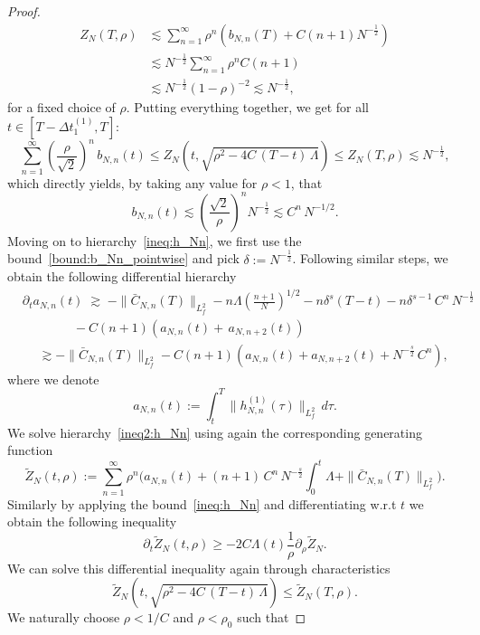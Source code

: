 \documentclass[pdflatex,sn-mathphys-num]{sn-jnl}
\theoremstyle{thmstyleone}%
\theoremstyle{thmstyletwo}%
\theoremstyle{thmstylethree}%
\begin{document}
\begin{proof}
\begin{align*}
Z_{N}(T, \rho) 
&\lesssim \sum_{n=1}^\infty \rho^n \left(  b_{N,n}(T) 
+ C(n+1) N^{-\frac{1}{2}}  \right) \\
&\lesssim N^{-\frac{1}{2}}\sum_{n=1}^\infty \rho^n C(n+1)  \\
&\lesssim  N^{-\frac{1}{2}} (1 - \rho)^{-2}\lesssim N^{-\frac{1}{2}},
\end{align*}
for a fixed choice of $\rho$.
\noindent
Putting everything together, we get for all \(t \in [T-\Delta t_1^{(1)},T]\):
\[
\sum_{n=1}^\infty \left( \frac{\rho}{\sqrt{2}} \right)^n\,b_{N,n}(t)  
\leq Z_{N}(t,\sqrt{\rho^2 - 4C\,(T-t)\, \Lambda} ) 
\leq Z_{N}(T, \rho) 
\lesssim N^{-\frac{1}{2}},
\]
which directly yields, by taking any value for $\rho<1$, that
\begin{equation}\label{bound:b_Nn_pointwise}
 b_{N,n}(t) \lesssim \left(\frac{\sqrt{2}}{\rho}\right)^n N^{-\frac{1}{2}}\lesssim C^n\,N^{-1/2}.
\end{equation} 
Moving on to hierarchy~\eqref{ineq:h_Nn}, we first use the bound~\eqref{bound:b_Nn_pointwise} and pick \(\delta := N^{-\frac{1}{2}}\). Following similar steps, we obtain the following differential hierarchy
\begin{equation}\label{ineq2:h_Nn}
\begin{aligned}
&\partial_t a_{N,n}(t)
\;\gtrsim\;
-\|\bar{C}_{N,n}(T)\|_{L^2_f}-n\Lambda\!\left(\frac{n+1}{N}\right)^{\!1/2}-n\delta^s(T-t)-n\delta^{s-1}\,C^n\, N^{-\frac{1}{2}}\\
&\qquad\qquad- C(n+1)\left( a_{N,n}(t) +\,a_{N,n+2}(t)\right)\\
&\quad\;\gtrsim - \| \bar{C}_{N,n}(T)\|_{L^2_f} -C(n+1) \left( a_{N,n}(t) + a_{N,n+2}(t) + N^{-\frac{s}{2}}\, C^n\right),
\end{aligned}
\end{equation}
where we denote
\[
a_{N,n}(t)
:= \int_{t}^{T} \|h_{N,n}^{(1)}(\tau)\|_{L^2_f}\,d \tau.
\]
We solve hierarchy~\eqref{ineq2:h_Nn} using again the corresponding generating function
\[
\widetilde{Z}_N(t,\rho)
:= \sum_{n=1}^{\infty} \rho^n
\Big(
a_{N,n}(t)
+ (n+1)\,C^n\,
N^{-\frac{s}{2}}\!\int_0^t \Lambda
+ \|\bar{C}_{N,n}(T)\|_{L^2_f}
\Big).
\]
Similarly by applying the bound~\eqref{ineq:h_Nn} and differentiating w.r.t \(t\) we obtain the following inequality 
\[
\partial_t \widetilde{Z}_N(t,\rho) \geq-2C \Lambda(t) \frac{1}{\rho} \partial_{\rho} \widetilde{Z}_N.
\]
We can solve this differential inequality again through characteristics
\[
\widetilde{Z}_N(t, \sqrt{\rho^2 - 4C\,(T-t)\, \Lambda}) \leq \widetilde{Z}_N(T, \rho).
\]
We naturally choose $\rho<1/C$ and $\rho<\rho_0$ such that

\end{proof}
\end{document}
